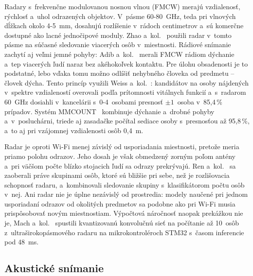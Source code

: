 \documentclass[10pt,twoside,a4paper]{article}
\begin{document}
Radary s~frekvenčne modulovanou nosnou vlnou (FMCW) merajú vzdialenosť, rýchlosť a~uhol odrazených objektov. V~pásme 60-80~GHz, teda pri vlnových dĺžkach okolo 4-5~mm, dosahujú rozlíšenie v~rádoch centimetrov a~sú komerčne dostupné ako lacné jednočipové moduly. Zhao a~kol.~\cite{zhao2019mid} použili radar v~tomto pásme na súčasné sledovanie viacerých osôb v~miestnosti. Rádiové snímanie zachytí aj veľmi jemné pohyby: Adib a~kol.~\cite{adib2015vital} merali FMCW rádiom dýchanie a~tep viacerých ľudí naraz bez akéhokoľvek kontaktu. Pre úlohu obsadenosti je to podstatné, lebo vďaka tomu možno odlíšiť nehybného človeka od predmetu -- človek dýcha. Tento princíp využili Weiss a~kol.~\cite{weiss2020people}: kandidátov na osoby nájdených v~spektre vzdialeností overovali podľa prítomnosti vitálnych funkcií a~s~radarom 60~GHz dosiahli v~kancelárii s~0-4~osobami presnosť $\pm 1$~osoba v~85,4\,\% prípadov. Systém MMCOUNT~\cite{hu2024mmcount} kombinuje dýchanie a~drobné pohyby a~v~posluchárni, triede aj zasadačke počítal sediace osoby s~presnosťou až 95,8\,\%, a~to aj pri vzájomnej vzdialenosti osôb 0,4~m.

Radar je oproti Wi-Fi menej závislý od usporiadania miestnosti, pretože meria priamo polohu odrazov. Jeho dosah je však obmedzený zorným poľom antény a~pri väčšom počte blízko stojacich ľudí sa odrazy prekrývajú. Ren a~kol.~\cite{ren2023grouped} sa zaoberali práve skupinami osôb, ktoré sú bližšie pri sebe, než je rozlišovacia schopnosť radaru, a~kombinovali sledovanie skupiny s~klasifikátorom počtu osôb v~nej. Ani radar nie je úplne nezávislý od prostredia: modely naučené pri jednom usporiadaní odrazov od okolitých predmetov sa podobne ako pri Wi-Fi musia prispôsobovať novým miestnostiam. Výpočtová náročnosť naopak prekážkou nie je, Mach a~kol.~\cite{mach2024uwb} spustili kvantizovanú konvolučnú sieť na počítanie až 10~osôb z~ultraširokopásmového radaru na mikrokontroléroch STM32 s~časom inferencie pod 48~ms.

\subsection{Akustické snímanie}
\end{document}
